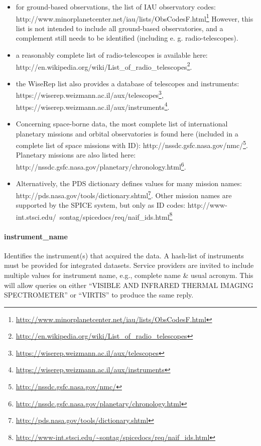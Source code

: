 \documentclass[11pt,a4paper]{ivoa}
\begin{document}
\begin{itemize}

\item for ground-based observations, the list of IAU observatory codes: http://www.minorplanetcenter.net/iau/lists/ObsCodesF.html\footnote{\url{http://www.minorplanetcenter.net/iau/lists/ObsCodesF.html}} However, this list is not intended to include all ground-based observatories, and a complement still needs to be identified (including e. g. radio-telescopes). 

\item a reasonably complete list of radio-telescopes is available here: http://en.wikipedia.org/wiki/List\_of\_radio\_telescopes\footnote{\url{http://en.wikipedia.org/wiki/List_of_radio_telescopes}}.

\item the WiseRep list also provides a  database of telescopes and instruments: https://wiserep.weizmann.ac.il/aux/telescopes\footnote{\url{https://wiserep.weizmann.ac.il/aux/telescopes}}, https://wiserep.weizmann.ac.il/aux/instruments\footnote{\url{https://wiserep.weizmann.ac.il/aux/instruments}}. 

\item Concerning space-borne data, the most complete list of international planetary missions and orbital observatories is found here (included in a complete list of space missions with ID): http://nssdc.gsfc.nasa.gov/nmc/\footnote{\url{http://nssdc.gsfc.nasa.gov/nmc/}}. Planetary missions are also listed here: http://nssdc.gsfc.nasa.gov/planetary/chronology.html\footnote{\url{http://nssdc.gsfc.nasa.gov/planetary/chronology.html}}. 

\item Alternatively, the PDS dictionary defines values for many mission names: http://pds.nasa.gov/tools/dictionary.shtml\footnote{\url{http://pds.nasa.gov/tools/dictionary.shtml}}. Other mission names are supported by the SPICE system, but only as ID codes: http://www-int.stsci.edu/~sontag/spicedocs/req/naif\_ids.html\footnote{\url{http://www-int.stsci.edu/~sontag/spicedocs/req/naif_ids.html}}

\end{itemize}

\paragraph{instrument\_name}

Identifies the instrument(s) that acquired the data. A hash-list of instruments must be provided for integrated datasets. Service providers are invited to include multiple values for instrument name, e.g., complete name \& usual acronym. This will allow queries on either ``VISIBLE AND INFRARED THERMAL IMAGING SPECTROMETER'' or ``VIRTIS'' to produce the same reply. 
\end{document}
